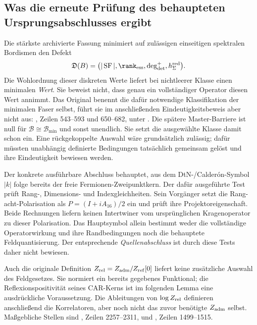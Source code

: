 \subsection{Was die erneute Prüfung des behaupteten Ursprungsabschlusses ergibt}\label{sec:originproofaudit}
Die stärkste archivierte Fassung minimiert auf zulässigen einseitigen spektralen Bordismen den Defekt
\begin{equation}
\mathfrak D(B)=\bigl(|\operatorname{SF}|,\rank_{\rm ess},\deg^+_{\det},h_\Sigma^{\rm red}\bigr).
\end{equation}
Die Wohlordnung dieser diskreten Werte liefert bei nichtleerer Klasse einen minimalen \emph{Wert}. Sie beweist nicht, dass genau ein vollständiger Operator diesen Wert annimmt. Das Original benennt die dafür notwendige Klassifikation der minimalen Faser selbst, führt sie im anschließenden Eindeutigkeitsbeweis aber nicht aus: , Zeilen 543--593 und 650--682, unter . Die spätere Master-Barriere ist null für $\mathcal B\cong\mathcal B_{\min}$ und sonst unendlich. Sie setzt die ausgewählte Klasse damit schon ein. Eine rückgekoppelte Auswahl wäre grundsätzlich zulässig; dafür müssten unabhängig definierte Bedingungen tatsächlich gemeinsam gelöst und ihre Eindeutigkeit bewiesen werden.

Der konkrete ausführbare Abschluss  behauptet, aus dem DtN-/Calder\'on-Symbol $|k|$ folge bereits der freie Fermionen-Zweipunktkern. Der dafür ausgeführte Test prüft Rang-, Dimensions- und Indexgleichheiten. Sein Vorgänger  setzt die Rang-acht-Polarisation als $P=(I+iA_{16})/2$ ein und prüft ihre Projektoreigenschaft. Beide Rechnungen liefern keinen Intertwiner vom ursprünglichen Kragenoperator zu dieser Polarisation. Das Hauptsymbol allein bestimmt weder die vollständige Operatorwirkung und ihre Randbedingungen noch die behauptete Feldquantisierung. Der entsprechende \emph{Quellenabschluss} ist durch diese Tests daher nicht bewiesen.

Auch die originale Definition $Z_{\rm rel}=Z_{\rm adm}/Z_{\rm ref}[0]$ liefert keine zusätzliche Auswahl des Feldgesetzes. Sie normiert ein bereits gegebenes Funktional; die Reflexionspositivität seines CAR-Kerns ist im folgenden Lemma eine ausdrückliche Voraussetzung. Die Ableitungen von $\log Z_{\rm rel}$ definieren anschließend die Korrelatoren, aber noch nicht das zuvor benötigte $Z_{\rm adm}$ selbst. Maßgebliche Stellen sind , Zeilen 2257--2311, und , Zeilen 1499--1515.

